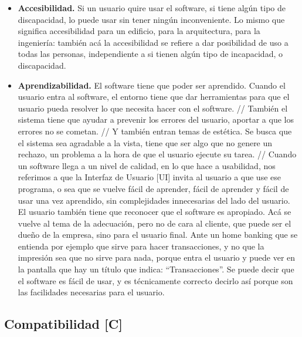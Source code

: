 \begin{itemize}

\item
  \textbf{Accesibilidad.} Si un usuario quire usar el software, si tiene
  algún tipo de discapacidad, lo puede usar sin tener ningún
  inconveniente. Lo mismo que significa accesibilidad para un edificio,
  para la arquitectura, para la ingeniería: también acá la accesibilidad
  se refiere a dar posibilidad de uso a todas las personas,
  independiente a si tienen algún tipo de incapacidad, o discapacidad.
\item
  \textbf{Aprendizabilidad.} El software tiene que poder ser aprendido.
  Cuando el usuario entra al software, el entorno tiene que dar
  herramientas para que el usuario pueda resolver lo que necesita hacer
  con el software. // También el sistema tiene que ayudar a prevenir los
  errores del usuario, aportar a que los errores no se cometan. // Y
  también entran temas de estética. Se busca que el sistema sea
  agradable a la vista, tiene que ser algo que no genere un rechazo, un
  problema a la hora de que el usuario ejecute su tarea. // Cuando un
  software llega a un nivel de calidad, en lo que hace a usabilidad, nos
  referimos a que la Interfaz de Usuario {[}UI{]} invita al usuario a
  que use ese programa, o sea que se vuelve fácil de aprender, fácil de
  aprender y fácil de usar una vez aprendido, sin complejidades
  innecesarias del lado del usuario. El usuario también tiene que
  reconocer que el software es apropiado. Acá se vuelve al tema de la
  adecuación, pero no de cara al cliente, que puede ser el dueño de la
  empresa, sino para el usuario final. Ante un home banking que se
  entienda por ejemplo que sirve para hacer transacciones, y no que la
  impresión sea que no sirve para nada, porque entra el usuario y puede
  ver en la pantalla que hay un título que indica: ``Transacciones''. Se
  puede decir que el software es fácil de usar, y es técnicamente
  correcto decirlo así porque son las facilidades necesarias para el
  usuario.
\end{itemize}

\hypertarget{compatibilidad-c}{%
\subsection{Compatibilidad {[}C{]}}\label{compatibilidad-c}}

